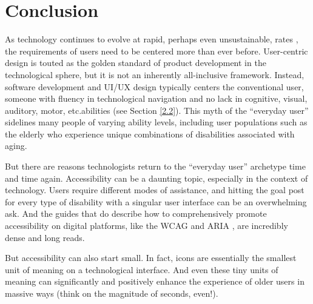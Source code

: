 \documentclass[12pt,twoside]{reedthesis}
\begin{document}
\section{Conclusion}\label{5.4}

    As technology continues to evolve at rapid, perhaps even unsustainable, rates \cite{chong_bad_2023}, the requirements of users need to be centered more than ever before. User-centric design is touted as the golden standard of product development in the technological sphere, but it is not an inherently all-inclusive framework. Instead, software development and UI/UX design typically centers the conventional user, someone with fluency in technological navigation and no lack in cognitive, visual, auditory, motor, etc.\@ abilities (see Section \ref{2.2}). This myth of the \enquote{everyday user} sidelines many people of varying ability levels, including user populations such as the elderly who experience unique combinations of disabilities associated with aging. 

    But there are reasons technologists return to the \enquote{everyday user} archetype time and time again. Accessibility can be a daunting topic, especially in the context of technology. Users require different modes of assistance, and hitting the goal post for every type of disability with a singular user interface can be an overwhelming ask. And the guides that do describe how to comprehensively promote accessibility on digital platforms, like the WCAG and ARIA \cite{kurniawan_research-derived_2005, putnam_it_2023}, are incredibly dense and long reads.

    But accessibility can also start small. In fact, icons are essentially the smallest unit of meaning on a technological interface. And even these tiny units of meaning can significantly and positively enhance the experience of older users in massive ways (think on the magnitude of seconds, even!). 

\end{document}
